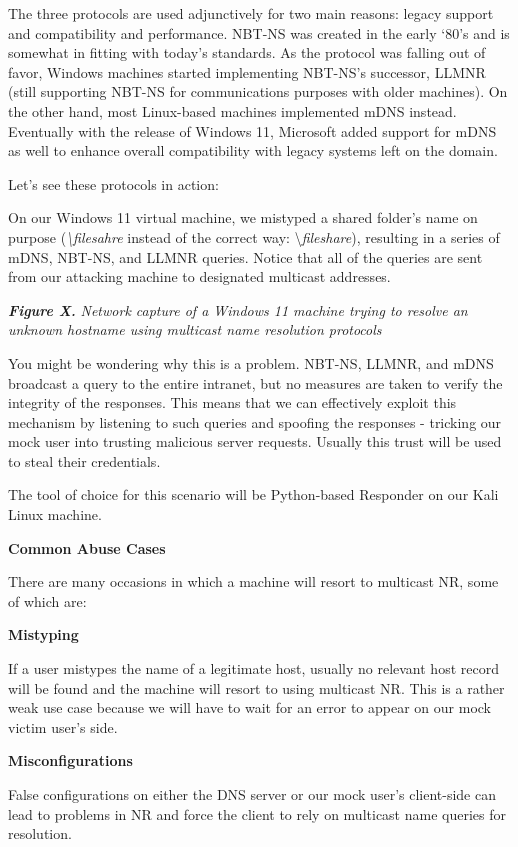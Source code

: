 The three protocols are used adjunctively for two main reasons: legacy support and compatibility and performance. NBT-NS was created in the early ‘80’s and is somewhat in fitting with today’s standards. As the protocol was falling out of favor, Windows machines started implementing NBT-NS’s successor, LLMNR (still supporting NBT-NS for communications purposes with older machines). On the other hand, most Linux-based machines implemented mDNS instead. Eventually with the release of Windows 11, Microsoft added support for mDNS as well to enhance overall compatibility with legacy systems left on the domain. 

Let’s see these protocols in action:

On our Windows 11 virtual machine, we mistyped a shared folder’s name on purpose (\textit{\textbackslash{}filesahre} instead of the correct way: \textbackslash{}\textit{fileshare}), resulting in a series of mDNS, NBT-NS, and LLMNR queries. Notice that all of the queries are sent from our attacking machine to designated multicast addresses.

\textit{\textbf{Figure X. }}\textit{Network capture of a Windows 11 machine trying to resolve an unknown hostname using multicast name resolution protocols}

You might be wondering why this is a problem. NBT-NS, LLMNR, and mDNS broadcast a query to the entire intranet, but no measures are taken to verify the integrity of the responses. This means that we can effectively exploit this mechanism by listening to such queries and spoofing the responses - tricking our mock user into trusting malicious server requests. Usually this trust will be used to steal their credentials.

The tool of choice for this scenario will be Python-based Responder on our Kali Linux machine.

\textbf{Common Abuse Cases}

There are many occasions in which a machine will resort to multicast NR, some of which are:

\textbf{Mistyping}

If a user mistypes the name of a legitimate host, usually no relevant host record will be found and the machine will resort to using multicast NR. This is a rather weak use case because we will have to wait for an error to appear on our mock victim user’s side.

\textbf{Misconfigurations}

False configurations on either the DNS server or our mock user’s client-side can lead to problems in NR and force the client to rely on multicast name queries for resolution.

